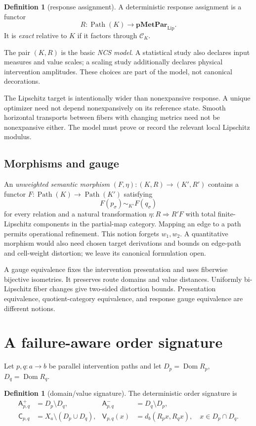 \documentclass[11pt]{article}
\theoremstyle{definition}
\newtheorem{definition}[theorem]{Definition}
\theoremstyle{remark}
\newcommand{\Path}{\operatorname{Path}}
\newcommand{\Dom}{\operatorname{Dom}}
\newcommand{\cK}{\mathcal{C}_K}
\newcommand{\vdef}{\mathsf{V}}
\newcommand{\afail}{\mathsf{A}}
\newcommand{\cfail}{\mathsf{C}}
\begin{document}
\begin{definition}[response assignment]
A deterministic response assignment is a functor
\[
R:\Path(K)\longrightarrow\mathbf{pMetPar}_{\mathrm{Lip}}.
\]
It is \emph{exact} relative to \(K\) if it factors through \(\cK\).
\end{definition}

The pair \((K,R)\) is the basic \emph{NCS model}. A statistical study also
declares input measures and value scales; a scaling study additionally
declares physical intervention amplitudes. These choices are part of the
model, not canonical decorations.

The Lipschitz target is intentionally wider than nonexpansive response.
A unique optimizer need not depend nonexpansively on its reference state.
Smooth horizontal transports between fibers with changing metrics need not be
nonexpansive either. The model must prove or record the relevant local
Lipschitz modulus.

\subsection{Morphisms and gauge}

An \emph{unweighted semantic morphism}
\((F,\eta):(K,R)\to(K',R')\) contains a functor
\(F:\Path(K)\to\Path(K')\) satisfying
\[
F(p_\sigma)\sim_{K'}F(q_\sigma)
\]
for every relation and a natural transformation
\(\eta:R\Rightarrow R'F\) with total finite-Lipschitz components in the
partial-map category. Mapping an edge to a path permits operational
refinement. This notion forgets \(w_1,w_2\). A quantitative morphism would
also need chosen target derivations and bounds on edge-path and cell-weight
distortion; we leave its canonical formulation open.

A gauge equivalence fixes the intervention presentation and uses fiberwise
bijective isometries. It preserves route domains and value distances.
Uniformly bi-Lipschitz fiber changes give two-sided distortion bounds.
Presentation equivalence, quotient-category equivalence, and response gauge
equivalence are different notions.

\section{A failure-aware order signature}

Let \(p,q:a\to b\) be parallel intervention paths and let
\(D_p=\Dom R_p\), \(D_q=\Dom R_q\).

\begin{definition}[domain/value signature]
The deterministic order signature is
\begin{align*}
\afail^+_{p,q}&=D_p\setminus D_q,
&
\afail^-_{p,q}&=D_q\setminus D_p,\\
\cfail_{p,q}&=X_a\setminus(D_p\cup D_q),
&
\vdef_{p,q}(x)&=d_b(R_px,R_qx),
\quad x\in D_p\cap D_q.
\end{align*}
\end{definition}
\end{document}
